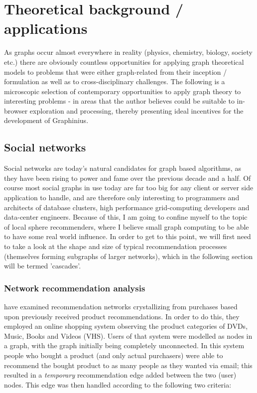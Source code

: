 \chapter{Theoretical background / applications}
\label{ch:theory_applications}

	As graphs occur almost everywhere in reality (physics, chemistry, biology, society etc.) there are obviously countless opportunities for applying graph theoretical models to problems that were either graph-related from their inception / formulation as well as to cross-disciplinary challenges. The following is a microscopic selection of contemporary opportunities to apply graph theory to interesting problems - in areas that the author believes could be suitable to in-browser exploration and processing, thereby presenting ideal incentives for the development of Graphinius.


	\section{Social networks}
	\label{sect:social_networks}
	
	Social networks are today's natural candidates for graph based algorithms, as they have been rising to power and fame over the previous decade and a half. Of course most social graphs in use today are far too big for any client or server side application to handle, and are therefore only interesting to programmers and architects of database clusters, high performance grid-computing developers and data-center engineers. Because of this, I am going to confine myself to the topic of local sphere recommenders, where I believe small graph computing to be able to have some real world influence. In order to get to this point, we will first need to take a look at the shape and size of typical recommendation processes (themselves forming subgraphs of larger networks), which in the following section will be termed 'cascades'.
	
		
		\subsection{Network recommendation analysis}
		\label{ssect:net_rec_anal}
		
		\citet{RecCascades} have examined recommendation networks crystallizing from purchases based upon previously received product recommendations. In order to do this, they employed an online shopping system observing the product categories of DVDs, Music, Books and Videos (VHS). Users of that system were modelled as nodes in a graph, with the graph initially being completely unconnected. In this system people who bought a product (and only actual purchasers) were able to recommend the bought product to as many people  as they wanted via email; this resulted in a \textit{temporary} recommendation edge added between the two (user) nodes. This edge was then handled according to the following two criteria:
		
